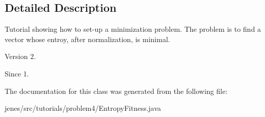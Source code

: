 \subsection{Detailed Description}
Tutorial showing how to set-\/up a minimization problem. The problem is to find a vector whose entroy, after normalization, is minimal.

\begin{DoxyVersion}{Version}
2. 
\end{DoxyVersion}
\begin{DoxySince}{Since}
1. 
\end{DoxySince}


The documentation for this class was generated from the following file\-:\begin{DoxyCompactItemize}
\item 
jenes/src/tutorials/problem4/Entropy\-Fitness.\-java\end{DoxyCompactItemize}
